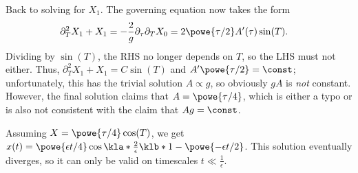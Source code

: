 \documentclass[english, parskip=full]{scrartcl}
\begin{document}
Back to solving for $X_1$.
The governing equation now takes the form
\begin{align}
\partial_T^2X_1 + X_1 &= -\frac{2}{g} \partial_\tau \partial_T X_0 = 2\powe{\tau/2} A'(\tau)\sin(T).
\end{align}
Dividing by $\sin(T)$, the RHS no longer depends on $T$, so the LHS must not either.
Thus, $\partial_T^2X_1 + X_1 = C\sin(T)$ and $A'\powe{\tau/2} = \const$; unfortunately, this has the trivial solution $A\propto g$, so obviously $gA$ is \emph{not} constant.
However, the final solution claims that $A=\powe{\tau/4}$, which is either a typo or is also not consistent with the claim that $Ag=\const$.

Assuming $X=\powe{\tau/4} \cos(T)$, we get $x(t) = \powe{\epsilon t/4} \cos\kla*{\frac{2}{\epsilon} \klb*{1 - \powe{-\epsilon t/2}}}$.
This solution eventually diverges, so it can only be valid on timescales $t\ll \frac{1}{\epsilon}$.
\end{document}
